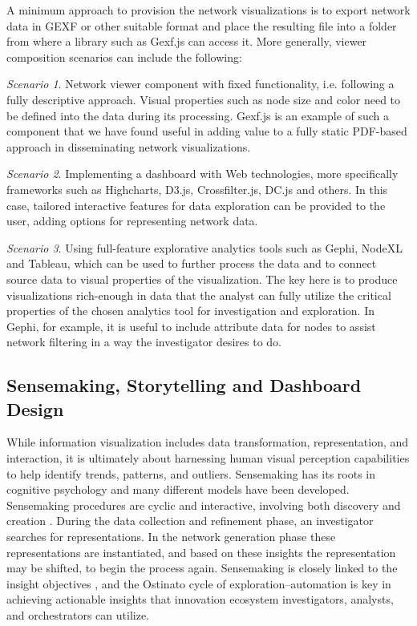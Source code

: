 A minimum approach to provision the network visualizations is to export network data in GEXF or other suitable format and place the resulting file into a folder from where a library such as Gexf.js can access it. More generally, viewer composition scenarios can include the following:

\emph{Scenario 1}. Network viewer component with fixed functionality, i.e. following a fully descriptive approach. Visual properties such as node size and color need to be defined into the data during its processing. Gexf.js is an example of such a component that we have found useful in adding value to a fully static PDF-based approach in disseminating network visualizations.

\emph{Scenario 2}. Implementing a dashboard with Web technologies, more specifically frameworks such as Highcharts, D3.js, Crossfilter.js, DC.js and others. In this case, tailored interactive features for data exploration can be provided to the user, adding options for representing network data. 

\emph{Scenario 3}. Using full-feature explorative analytics tools such as Gephi, NodeXL and Tableau, which can be used to further process the data and to connect source data to visual properties of the visualization. The key here is to produce visualizations rich-enough in data that the analyst can fully utilize the critical properties of the chosen analytics tool for investigation and exploration. In Gephi, for example, it is useful to include attribute data for nodes to assist network filtering in a way the investigator desires to do.

\subsection{Sensemaking, Storytelling and Dashboard Design}

While information visualization includes data transformation, representation, and interaction, it is ultimately about harnessing human visual perception capabilities to help identify trends, patterns, and outliers. Sensemaking has its roots in cognitive psychology and many different models have been developed. Sensemaking procedures are cyclic and interactive, involving both discovery and creation \citep{North2006}. During the data collection and refinement phase, an investigator searches for representations. In the network generation phase these representations are instantiated, and based on these insights the representation may be shifted, to begin the process again. Sensemaking is closely linked to the insight objectives \citep{Konno2014}, and the Ostinato cycle of exploration–automation is key in achieving actionable insights that innovation ecosystem investigators, analysts, and orchestrators can utilize.

